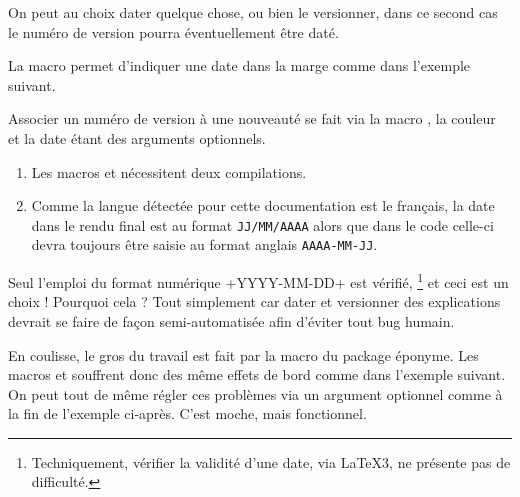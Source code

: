 On peut au choix dater quelque chose, ou bien le versionner, dans ce second cas le numéro de version pourra éventuellement être daté.


\begin{tdocexa}
    La macro  permet d'indiquer une date dans la marge comme dans l'exemple suivant.


\end{tdocexa}


\begin{tdocexa}
    Associer un numéro de version à une nouveauté se fait via la macro , la couleur et la date étant des arguments optionnels.


\end{tdocexa}


\begin{tdocimp}
    \begin{enumerate}[wide]
        \item Les macros  et  nécessitent deux compilations.

        \item Comme la langue détectée pour cette documentation est le français, la date dans le rendu final est au format \texttt{JJ/MM/AAAA} alors que dans le code celle-ci devra toujours être saisie au format anglais \texttt{AAAA-MM-JJ}.
    \end{enumerate}
\end{tdocimp}


\begin{tdoccaut}
    Seul l'emploi du format numérique \tdocinlatex+YYYY-MM-DD+ est vérifié,
    \footnote{
        Techniquement, vérifier la validité d'une date, via \LaTeX3, ne présente pas de difficulté.
    }
    et ceci est un choix ! Pourquoi cela ? Tout simplement car dater et versionner des explications devrait se faire de façon semi-automatisée afin d'éviter tout bug humain.
\end{tdoccaut}


\begin{tdocwarn}
    En coulisse, le gros du travail est fait par la macro  du package éponyme.
    Les macros  et  souffrent donc des même effets de bord comme dans l'exemple suivant.
    On peut tout de même régler ces problèmes via un argument optionnel  comme à la fin de l'exemple ci-après. C'est moche, mais fonctionnel.


\end{tdocwarn}



